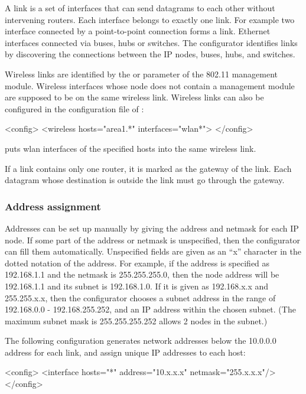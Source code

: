 A link is a set of interfaces that can send datagrams to each other
without intervening routers. Each interface belongs to exactly
one link. For example two interface connected
by a point-to-point connection forms a link. Ethernet interfaces
connected via buses, hubs or switches.
The configurator identifies links by discovering
the connections between the IP nodes, buses, hubs, and switches.

Wireless links are identified by the  or 
parameter of the 802.11 management module. Wireless interfaces
whose node does not contain a management module are supposed
to be on the same wireless link. Wireless links can also be
configured in the configuration file of :

\begin{XML}
<config>
  <wireless hosts="area1.*" interfaces="wlan*">
</config>
\end{XML}

puts wlan interfaces of the specified hosts into the same wireless link.

If a link contains only one router, it is marked as the gateway
of the link. Each datagram whose destination is outside the link
must go through the gateway.

\subsubsection*{Address assignment}

Addresses can be set up manually by giving the address and netmask for
each IP node. If some part of the address or netmask is unspecified,
then the configurator can fill them automatically. Unspecified fields
are given as an ``x'' character in the dotted notation of the address.
For example, if the address is specified as 192.168.1.1 and the
netmask is 255.255.255.0, then the node address will be 192.168.1.1
and its subnet is 192.168.1.0. If it is given as 192.168.x.x and
255.255.x.x, then the configurator chooses a subnet address in the range
of 192.168.0.0 - 192.168.255.252, and an IP address within the chosen
subnet. (The maximum subnet mask is 255.255.255.252 allows 2 nodes in the subnet.)

The following configuration generates network addresses below the 10.0.0.0
address for each link, and assign unique IP addresses to each host:

\begin{XML}
<config>
  <interface hosts="*" address="10.x.x.x" netmask="255.x.x.x"/>
</config>
\end{XML}

